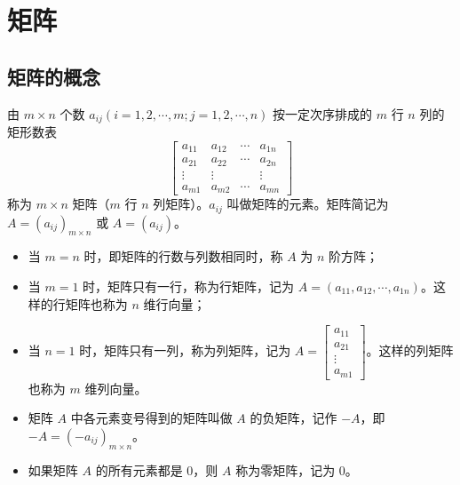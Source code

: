 \documentclass[UTF8]{ctexart}
\theoremstyle{mydef}
\begin{document}
\newpage
\section{矩阵}

\subsection{矩阵的概念}
由 $m \times n$ 个数 $a_{ij} (i=1, 2, \cdots, m; j=1, 2, \cdots, n)$ 按一定次序排成的 $m$ 行 $n$ 列的矩形数表
$$
\begin{bmatrix}
a_{11} & a_{12} & \cdots & a_{1n} \\
a_{21} & a_{22} & \cdots & a_{2n} \\
\vdots & \vdots & & \vdots \\
a_{m1} & a_{m2} & \cdots & a_{mn}
\end{bmatrix}
$$
称为 $m \times n$ 矩阵（$m$ 行 $n$ 列矩阵）。$a_{ij}$ 叫做矩阵的元素。矩阵简记为 $A = (a_{ij})_{m \times n}$ 或 $A = (a_{ij})$。

\begin{itemize}
    \item 当 $m=n$ 时，即矩阵的行数与列数相同时，称 $A$ 为 $n$ 阶方阵；
    \item 当 $m=1$ 时，矩阵只有一行，称为行矩阵，记为 $A = (a_{11}, a_{12}, \cdots, a_{1n})$。这样的行矩阵也称为 $n$ 维行向量；
    \item 当 $n=1$ 时，矩阵只有一列，称为列矩阵，记为 $A = \begin{bmatrix} a_{11} \\ a_{21} \\ \vdots \\ a_{m1} \end{bmatrix}$。这样的列矩阵也称为 $m$ 维列向量。
    \item 矩阵 $A$ 中各元素变号得到的矩阵叫做 $A$ 的负矩阵，记作 $-A$，即 $-A = (-a_{ij})_{m \times n}$。
    \item 如果矩阵 $A$ 的所有元素都是 0，则 $A$ 称为零矩阵，记为 $0$。
\end{itemize}
\end{document}
